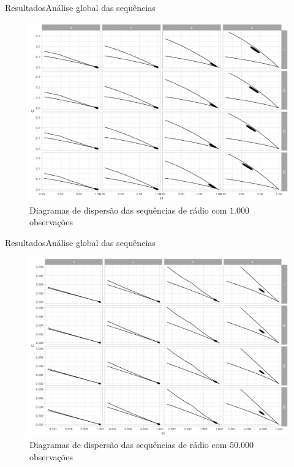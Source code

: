 \documentclass[10pt,xcolor={dvipsnames}]{beamer}
\begin{document}
\begin{frame}{Resultados}{Análise global das sequências}
	\begin{figure}[hbt]
		\centering
		\includegraphics[width=.9\linewidth]{ScatterAll_Radio_1k}
		\caption{Diagramas de dispersão das sequências de rádio com $1.000$ observações} %
	\end{figure}	
\end{frame}

\begin{frame}{Resultados}{Análise global das sequências}
	\begin{figure}[hbt]
		\centering
		\includegraphics[width=.9\linewidth]{ScatterAll_Radio_50k}
		\caption{Diagramas de dispersão das sequências de rádio com $50.000$ observações} %
	\end{figure}	
\end{frame}
\end{document}
